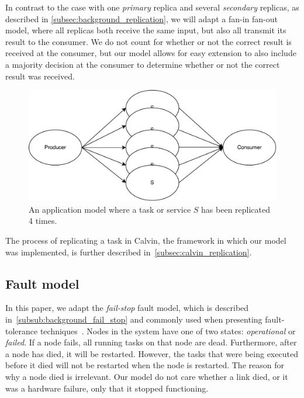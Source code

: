 \documentclass{cslthse-msc}
\begin{document}
In contrast to the case with one \emph{primary} replica and several \emph{secondary} replicas, as described in \cref{subsec:background_replication}, we will adapt a fan-in fan-out model, where all replicas both receive the same input, but also all transmit its result to the consumer. We do not count for whether or not the correct result is received at the consumer, but our model allows for easy extension to also include a majority decision at the consumer to determine whether or not the correct result was received. %

\begin{figure}[!hbt]
\centering
\includegraphics[scale=0.5]{images/app_model_replication.pdf} 
\caption{An application model where a task or service $S$ has been replicated 4 times.}\label{fig:app_model_replication}
\end{figure}

The process of replicating a task in Calvin, the framework in which our model was implemented, is further described in~\cref{subsec:calvin_replication}.

\subsection{Fault model} \label{subsec:design_fault_model}
In this paper, we adapt the \emph{fail-stop} fault model, which is described in~\cref{subsub:background_fail_stop} and commonly used when presenting fault-tolerance techniques~\cite{surveyFaultParallel}. Nodes in the system have one of two states: \emph{operational} or \emph{failed}. If a node fails, all running tasks on that node are dead. Furthermore, after a node has died, it will be restarted. However, the tasks that were being executed before it died will not be restarted when the node is restarted. The reason for why a node died is irrelevant. Our model do not care whether a link died, or it was a hardware failure, only that it stopped functioning.
\end{document}
